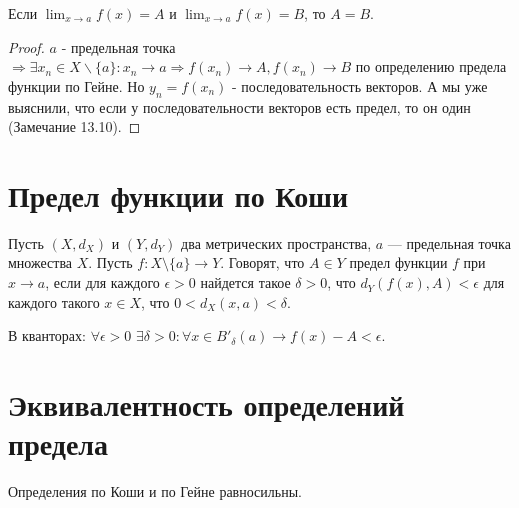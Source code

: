     \begin{sentence}
    	Если $\displaystyle \lim_{x \rightarrow a} f(x) = A$ и $\displaystyle \lim_{x \rightarrow a} f(x) = B$, то $A = B$.
    \end{sentence}
    
    \begin{proof}
    	$a$ - предельная точка $\Rightarrow \exists x_n \in X \backslash \{a\} : x_n \to a \Rightarrow f(x_n) \to A, f(x_n) \to B$ по определению предела функции по Гейне. Но $y_n = f(x_n)$ - последовательность векторов. А мы уже выяснили, что если у последовательности векторов есть предел, то он один (Замечание 13.10).
    \end{proof}
    
    \section{Предел функции по Коши}
    
    \begin{definition}
    	Пусть $(X, d_X)$ и $(Y, d_Y)$ два метрических пространства, $a$ —
    	предельная точка множества $X$. Пусть $f : X \setminus \{a\} \rightarrow Y$. Говорят, что $A \in Y$ предел функции $f$ при $x \rightarrow a$, если для каждого $\epsilon > 0$ найдется такое $\delta > 0$, что $d_Y(f(x), A) < \epsilon$ для каждого такого $x \in X$, что $0 < d_X(x, a) < \delta$.
    \end{definition}
    
    В кванторах: $\forall \epsilon > 0$ $\exists \delta > 0: \forall x \in B'_{\delta}(a) \rightarrow f(x) - A < \epsilon$.
    
    \section{Эквивалентность определений предела}
    
    \begin{theorem}
    	Определения по Коши и по Гейне равносильны.
    \end{theorem}
    
